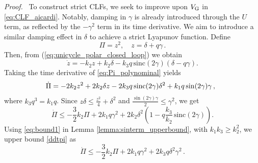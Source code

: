 \documentclass[journal,twoside,web]{ieeecolor}
\theoremstyle{definition}
\renewenvironment{proof}[1][Proof]{\par\pushQED{\qed}\normalfont\textit{#1.}~}{\popQED\par}
\begin{document}
\begin{proof}
To construct strict CLFs, we seek to improve upon $V_{\rm G}$ in \eqref{eq:CLF_aicardi}. Notably, damping in $\gamma$ is already introduced through the $U$ term, as reflected by the $-\gamma^2$ term in its time derivative. We aim to introduce a similar damping effect in $\delta$ to achieve a strict Lyapunov function.
Define
\begin{equation}
    \Pi = z^2, \quad  z = \delta + q \gamma \,.\label{eq:Pi_polynominal}
\end{equation}
Then, from (\ref{eq:unicycle_polar_closed_loop}) we obtain
\begin{equation}
\dot{z}
= -k_2 z + k_2 \delta - k_3 q \,\mbox{sinc}(2\gamma)
\left(\delta-q \gamma \right).
\end{equation}
Taking the time derivative of \eqref{eq:Pi_polynominal} yields 
\begin{equation}
\hspace*{-0.2cm}
\dot{\Pi} = -2k_2 z^2 + 2k_2 \delta z
- 2k_3 q \,\mbox{sinc}(2\gamma)
\delta^2 +  k_1 q \sin(2\gamma) \gamma \,,\label{eq:dot_Pi_polynomial}    
\end{equation} 
where $k_3 q^3 = k_1 q$. Since 
$z \delta \le \frac{z^2}{4} + \delta^2$ and
$\frac{\sin(2\gamma) \gamma}{2}  \le  \gamma^2$, we get
\begin{equation}
\dot{\Pi} 
\le - \frac{3}{2} k_2 \Pi +  2 k_1 q  \gamma^2
+  2 k_2 \delta^2 \left( 1 -   q \frac{k_3}{k_2} \,\mbox{sinc}(2\gamma)
\right) 
\label{ddtpi}.
\end{equation}
Using \eqref{eq:bound1} in Lemma \ref{lemma:sinterm_upperbound}, with $ k_1 k_3 \ge k_2^2$, we upper bound \eqref{ddtpi} as
\begin{equation}
\label{eq-Pidot-problem}
\dot{\Pi} \leq -  \frac{3}{2} k_2 \Pi +2 k_1 q  \gamma^2 + 2 k_3 q  \delta^2 \gamma^2 \,.

\end{equation}
\end{proof}
\end{document}
